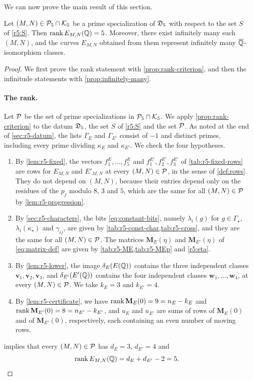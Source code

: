 We can now prove the main result of this section.

\begin{theorem}\label{thm:r5}
Let $(M,N)\in\mathcal P_5\cap\mathcal K_5$ be a prime specialization of $\mathfrak D_5$ with respect to the set $S$ of \eqref{r5:S}. Then $\operatorname{rank} E_{M,N}(\mathbb Q)=5$. Moreover, there exist infinitely many such $(M,N)$, and the curves $E_{M,N}$ obtained from them represent infinitely many $\overline{\mathbb Q}$-isomorphism classes.
\end{theorem}

\begin{proof}
We first prove the rank statement with \cref{prop:rank-criterion}, and then the infinitude statements with \cref{prop:infinitely-many}.

\paragraph{The rank.} Let $\mathcal P$ be the set of prime specializations in $\mathcal P_5\cap\mathcal K_5$. We apply \cref{prop:rank-criterion} to the datum $\mathfrak D_5$, the set $S$ of \eqref{r5:S} and the set $\mathcal P$. As noted at the end of \cref{sec:r5-datum}, the lists $\Gamma_E$ and $\Gamma_{E'}$ consist of $-1$ and distinct primes, including every prime dividing $\kappa_E$ and $\kappa_{E'}$. We check the four hypotheses.
\begin{enumerate}[label=(\roman*)]
\item By \cref{lem:r5-fixed}, the vectors $f^E_1,\dots,f^E_5$ and $f^{E'}_1,f^{E'}_2,f^{E'}_3$ of \cref{tab:r5-fixed-rows} are rows for $E_{M,N}$ and $E'_{M,N}$ at every $(M,N)\in\mathcal P$, in the sense of \cref{def:rows}. They do not depend on $(M,N)$, because their entries depend only on the residues of the $p_j$ modulo $8$, $3$ and $5$, which are the same for all $(M,N)\in\mathcal P$ by \cref{lem:r5-progression}.
\item By \cref{sec:r5-characters}, the bits \eqref{eq:constant-bits}, namely $\lambda_i(g)$ for $g\in\Gamma_\star$, $\lambda_i(\kappa_\star)$ and $\gamma_{ij}$, are given by \cref{tab:r5-const-char,tab:r5-cross}, and they are the same for all $(M,N)\in\mathcal P$. The matrices $\mathbf M_E(\eta)$ and $\mathbf M_{E'}(\eta)$ of \eqref{eq:matrix-def} are given by \cref{tab:r5-ME,tab:r5-MEp} and \eqref{r5:eta}.
\item By \cref{lem:r5-lower}, the image $\delta_E(E(\mathbb Q))$ contains the three independent classes $\mathbf v_1,\mathbf v_2,\mathbf v_3$, and $\delta_{E'}(E'(\mathbb Q))$ contains the four independent classes $\mathbf w_1,\dots,\mathbf w_4$, at every $(M,N)\in\mathcal P$. We take $k_E=3$ and $k_{E'}=4$.
\item By \cref{lem:r5-certificate}, we have $\operatorname{rank}\mathbf M_E(0)=9=n_E-k_E$ and $\operatorname{rank}\mathbf M_{E'}(0)=8=n_{E'}-k_{E'}$, and $u_E$ and $u_{E'}$ are sums of rows of $\mathbf M_E(0)$ and of $\mathbf M_{E'}(0)$, respectively, each containing an even number of moving rows.
\end{enumerate}
 implies that every $(M,N)\in\mathcal P$ has $d_E=3$, $d_{E'}=4$ and
\[
\operatorname{rank} E_{M,N}(\mathbb Q)=d_E+d_{E'}-2=5.
\]


\end{proof}
